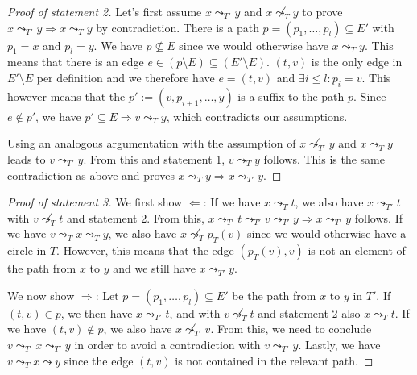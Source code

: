 \begin{proof}[Proof of statement 2]
    Let's first assume $x \leadsto_{T'} y$ and $x \not\leadsto_{T} y$ to prove $x \leadsto_{T'} y \Rightarrow x \leadsto_T y$ by contradiction. There is a path $p = (p_1, \dots, p_l) \subseteq E'$ with $p_1 = x$ and $p_l = y$. We have $p \not\subseteq E$ since we would otherwise have $x \leadsto_T y$. This means that there is an edge $e \in (p \setminus E) \subseteq (E' \setminus E)$. $(t, v)$ is the only edge in $E' \setminus E$ per definition and we therefore have $e = (t, v)$ and $\exists i \leq l: p_i = v$. This however means that the $p' := (v, p_{i+1}, \dots, y)$ is a suffix to the path $p$. Since $e \notin p'$, we have $p' \subseteq E \Rightarrow v \leadsto_{T} y$, which contradicts our assumptions.

    Using an analogous argumentation with the assumption of $x \not\leadsto_{T'} y$ and $x \leadsto_T y$ leads to $v \leadsto_{T'} y$. From this and statement 1, $v \leadsto_T y$ follows. This is the same contradiction as above and proves $x \leadsto_T y \Rightarrow x \leadsto_{T'} y$.
\end{proof}

\begin{proof}[Proof of statement 3]
    We first show $\Leftarrow$: If we have $x \leadsto_T t$, we also have $x \leadsto_{T'} t$ with $v \not\leadsto_T t$ and statement 2. From this, $x \leadsto_{T'} t \leadsto_{T'} v \leadsto_{T'} y \Rightarrow x \leadsto_{T'} y$ follows. If we have $v \leadsto_T x \leadsto_T y$, we also have $x \not\leadsto_T p_T(v)$ since we would otherwise have a circle in $T$. However, this means that the edge $(p_T(v), v)$ is not an element of the path from $x$ to $y$ and we still have $x \leadsto_{T'} y$.

    We now show $\Rightarrow$: Let $p = (p_1, \dots, p_l) \subseteq E'$ be the path from $x$ to $y$ in $T'$. If $(t, v) \in p$, we then have $x \leadsto_{T'} t$, and with $v \not\leadsto_T t$ and statement 2 also $x \leadsto_T t$. If we have $(t, v) \notin p$, we also have $x \not\leadsto_{T'} v$. From this, we need to conclude $v \leadsto_{T'} x \leadsto_{T'} y$ in order to avoid a contradiction with $v \leadsto_{T'} y$. Lastly, we have $v \leadsto_T x \leadsto y$ since the edge $(t, v)$ is not contained in the relevant path.
\end{proof}

